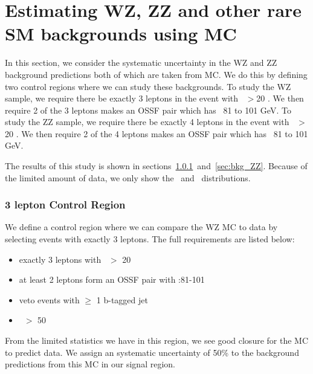 \clearpage

\section{Estimating WZ, ZZ and other rare SM backgrounds using MC}
\label{sec:bkg_rareSMBG}

In this section, we consider the systematic uncertainty in the WZ and ZZ background predictions both of which are taken from MC.
We do this by defining two control regions where we can study these backgrounds.
To study the WZ sample, we require there be exactly 3 leptons in the event with \pt~$>$20 \gev.
We then require 2 of the 3 leptons makes an OSSF pair which has \mll~81 to 101 GeV.
To study the ZZ sample, we require there be exactly 4 leptons in the event with \pt~$>$20 \gev.
We then require 2 of the 4 leptons makes an OSSF pair which has \mll~81 to 101 GeV.

The results of this study is shown in sections~\ref{sec:bkg_WZ}~and~\ref{sec:bkg_ZZ}.
Because of the limited amount of data, we only show the \MET\ and \nj\ distributions.

\subsubsection{3 lepton Control Region}
\label{sec:bkg_WZ}

We define a control region where we can compare the WZ MC to data by selecting events with exactly 3 leptons.
The full requirements are listed below:

\begin{itemize}
\item exactly 3 leptons with \pt\ $>$ 20 \gev
\item at least 2 leptons form an OSSF pair with \mll:81-101 \gev
\item veto events with $\geq$ 1 b-tagged jet
\item \MET\ $>$ 50 \gev 
\end{itemize}

From the limited statistics we have in this region, we see good closure for the MC to predict data.
We assign an systematic uncertainty of 50\% to the background predictions from this MC in our signal region.

